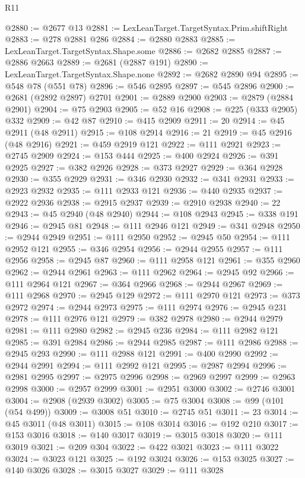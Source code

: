 \begin{lexlean}{R11}
\begin{coremodule}
{{{{{{{{{{{{{{{{{{{{{{{{{{{{{{{{{{{{{{{{{{{{{{{{{{{{{{{{{{{{{{{{{{{{{{{{{{{{{{{{{{@2880 := @2677 @13
@2881 := LexLeanTarget.TargetSyntax.Prim.shiftRight
@2883 := @278 @2881 @286
@2884 := @2880 @2883
@2885 := LexLeanTarget.TargetSyntax.Shape.some
@2886 := @2682 @2885
@2887 := @2886 @2663
@2889 := @2681 (@2887 @191)
@2890 := LexLeanTarget.TargetSyntax.Shape.none
@2892 := @2682 @2890 @94
@2895 := @548 @78 (@551 @78)
@2896 := @546 @2895
@2897 := @545 @2896
@2900 := @2681 (@2892 @2897) @2701
@2901 := @2889 @2900
@2903 := @2879 (@2884 @2901)
@2904 := @75 @2903
@2905 := @52 @16
@2908 := @225 (@333 @2905) @332
@2909 := @42 @87
@2910 := @415 @2909
@2911 := 20
@2914 := @45 @2911 (@48 @2911)
@2915 := @108 @2914
@2916 := 21
@2919 := @45 @2916 (@48 @2916)
@2921 := @459 @2919 @121
@2922 := @111 @2921
@2923 := @2745 @2909
@2924 := @153 @444
@2925 := @400 @2924
@2926 := @391 @2925
@2927 := @382 @2926
@2928 := @373 @2927
@2929 := @364 @2928
@2930 := @355 @2929
@2931 := @346 @2930
@2932 := @341 @2931
@2933 := @2923 @2932
@2935 := @111 @2933 @121
@2936 := @440 @2935
@2937 := @2922 @2936
@2938 := @2915 @2937
@2939 := @2910 @2938
@2940 := 22
@2943 := @45 @2940 (@48 @2940)
@2944 := @108 @2943
@2945 := @338 @191
@2946 := @2945 @81
@2948 := @111 @2946 @121
@2949 := @341 @2948
@2950 := @2944 @2949
@2951 := @111 @2950
@2952 := @2945 @50
@2954 := @111 @2952 @121
@2955 := @346 @2954
@2956 := @2944 @2955
@2957 := @111 @2956
@2958 := @2945 @87
@2960 := @111 @2958 @121
@2961 := @355 @2960
@2962 := @2944 @2961
@2963 := @111 @2962
@2964 := @2945 @92
@2966 := @111 @2964 @121
@2967 := @364 @2966
@2968 := @2944 @2967
@2969 := @111 @2968
@2970 := @2945 @129
@2972 := @111 @2970 @121
@2973 := @373 @2972
@2974 := @2944 @2973
@2975 := @111 @2974
@2976 := @2945 @231
@2978 := @111 @2976 @121
@2979 := @382 @2978
@2980 := @2944 @2979
@2981 := @111 @2980
@2982 := @2945 @236
@2984 := @111 @2982 @121
@2985 := @391 @2984
@2986 := @2944 @2985
@2987 := @111 @2986
@2988 := @2945 @293
@2990 := @111 @2988 @121
@2991 := @400 @2990
@2992 := @2944 @2991
@2994 := @111 @2992 @121
@2995 := @2987 @2994
@2996 := @2981 @2995
@2997 := @2975 @2996
@2998 := @2969 @2997
@2999 := @2963 @2998
@3000 := @2957 @2999
@3001 := @2951 @3000
@3002 := @2746 @3001
@3004 := @2908 (@2939 @3002)
@3005 := @75 @3004
@3008 := @99 (@101 (@54 @499))
@3009 := @3008 @51
@3010 := @2745 @51
@3011 := 23
@3014 := @45 @3011 (@48 @3011)
@3015 := @108 @3014
@3016 := @192 @210
@3017 := @153 @3016
@3018 := @140 @3017
@3019 := @3015 @3018
@3020 := @111 @3019
@3021 := @209 @304
@3022 := @422 @3021
@3023 := @111 @3022
@3024 := @3023 @121
@3025 := @192 @3024
@3026 := @153 @3025
@3027 := @140 @3026
@3028 := @3015 @3027
@3029 := @111 @3028
}}}}}}}}}}}}}}}}}}}}}}}}}}}}}}}}}}}}}}}}}}}}}}}}}}}}}}}}}}}}}}}}}}}}}}}}}}}}}}}}}}
\end{coremodule}
\end{lexlean}
